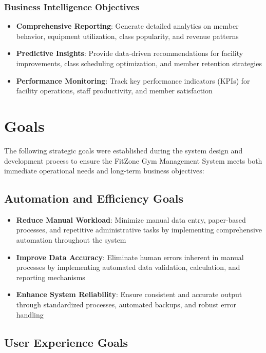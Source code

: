 \documentclass[12pt,a4paper]{report}
\begin{document}
\subsubsection{Business Intelligence Objectives}

\begin{itemize}[leftmargin=*]
    \item \textbf{Comprehensive Reporting}: Generate detailed analytics on member behavior, equipment utilization, class popularity, and revenue patterns
    \item \textbf{Predictive Insights}: Provide data-driven recommendations for facility improvements, class scheduling optimization, and member retention strategies
    \item \textbf{Performance Monitoring}: Track key performance indicators (KPIs) for facility operations, staff productivity, and member satisfaction
\end{itemize}

\section{Goals}
\label{sec:goals}

The following strategic goals were established during the system design and development process to ensure the FitZone Gym Management System meets both immediate operational needs and long-term business objectives:

\subsection{Automation and Efficiency Goals}

\begin{itemize}[leftmargin=*]
    \item \textbf{Reduce Manual Workload}: Minimize manual data entry, paper-based processes, and repetitive administrative tasks by implementing comprehensive automation throughout the system
    \item \textbf{Improve Data Accuracy}: Eliminate human errors inherent in manual processes by implementing automated data validation, calculation, and reporting mechanisms
    \item \textbf{Enhance System Reliability}: Ensure consistent and accurate output through standardized processes, automated backups, and robust error handling
\end{itemize}

\subsection{User Experience Goals}
\end{document}
